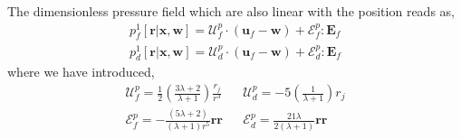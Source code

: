 The dimensionless pressure field which are also linear with the position reads as,
\begin{align*}
    p_f^1[\textbf{r}|\textbf{x},\textbf{w}]
    = 
    \mathcal{U}_f^p\cdot (\textbf{u}_f - \textbf{w})
    + \mathcal{E}_f^p: \textbf{E}_{f}\\
    p_d^1[\textbf{r}|\textbf{x},\textbf{w}]
    = 
    \mathcal{U}_d^p\cdot (\textbf{u}_f - \textbf{w})
    + \mathcal{E}_d^p: \textbf{E}_{f}
\end{align*}
where we have introduced, 
\begin{align*}
   \mathcal{U}_f^p = 
     \frac{1}{2}\left(\frac{3\lambda + 2}{\lambda +1}\right) \frac{r_j}{r^3}
   && \mathcal{U}_d^p = 
   - 5 \left(\frac{1}{\lambda +1}\right) r_j\\
   \mathcal{E}_f^p = - \frac{(5\lambda+2)}{(\lambda+1)r^5}\textbf{rr}
   &&\mathcal{E}_d^p = \frac{21\lambda}{2(\lambda+1)} \textbf{rr}
\end{align*}





